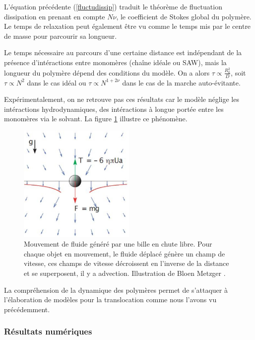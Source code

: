 L'équation précédente (\ref{fluctudissip}) traduit le théorème de fluctuation dissipation  en prenant en compte $N \nu$, le coefficient de Stokes global du polymère. Le temps de relaxation peut également être vu comme le temps mis par le centre de masse pour parcourir sa longueur.

 Le temps nécessaire au parcours d'une certaine distance est indépendant de la présence d'intéractions entre monomères (chaîne idéale ou SAW), mais la longueur du polymère dépend des conditions du modèle. On a alors $\tau \propto \frac{R_0^2}{D}$, soit $\tau \propto N^2 $ dans le cas idéal ou $\tau \propto N^{1+2\nu} $ dans le cas de la marche auto-évitante. 

Expérimentalement, on ne retrouve pas ces résultats car le modèle néglige les intéractions hydrodynamiques, des intéractions à longue portée entre les monomères via le solvant. La figure \ref{hydrodyninterac} illustre ce phénomène.


\begin{figure}[H]
\begin{center}
\includegraphics[width=0.5\textwidth]{hydrodyninterac.jpg} 

\caption[Intéractions hydrodynamiques]{Mouvement de fluide généré par une bille en chute libre. Pour chaque objet en mouvement, le fluide déplacé génère un champ de vitesse, ces champs de vitesse décroissent en l'inverse de la distance et se superposent, il y a advection. Illustration de Bloen Metzger \cite{bloen}.}
\label{hydrodyninterac}
\end{center}
\end{figure}

La compréhension de la dynamique des polymères permet de s'attaquer à l'élaboration de modèles pour la translocation comme nous l'avons vu précédemment.


\subsubsection{Résultats numériques}



